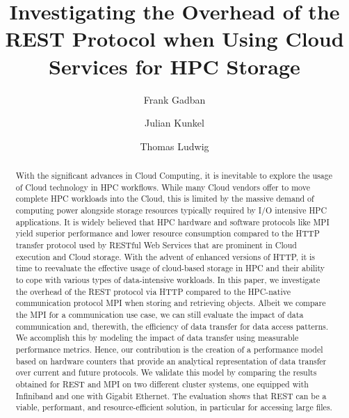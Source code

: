\documentclass[runningheads]{llncs}
\begin{document}
\title{Investigating the Overhead of the REST Protocol when Using Cloud Services for HPC Storage}
\author{Frank Gadban \and Julian Kunkel \and Thomas Ludwig}

\maketitle

\begin{abstract}
With the significant advances in Cloud Computing, it is inevitable to explore the usage of Cloud technology in HPC workflows. While many Cloud vendors offer to move complete HPC workloads into the Cloud, this is limited by the massive demand of computing power alongside storage resources typically required by I/O intensive HPC applications. It is widely believed that HPC hardware and software protocols like MPI yield superior performance and lower resource consumption compared to the HTTP transfer protocol used by RESTful Web Services that are prominent in Cloud execution and Cloud storage. With the advent of enhanced versions of HTTP, it is time to reevaluate the effective usage of cloud-based storage in HPC and their ability to cope with various types of data-intensive workloads.
In this paper, we investigate the overhead of the REST protocol via HTTP compared to the HPC-native communication protocol MPI when storing and retrieving objects. Albeit we compare the MPI for a communication use case, we can still evaluate the impact of data communication and, therewith, the efficiency of data transfer for data access patterns. We accomplish this by modeling the impact of data transfer using measurable performance metrics. Hence, our contribution is the creation of a performance model based on hardware counters that provide an analytical representation of data transfer over current and future protocols. We validate this model by comparing the results obtained for REST and MPI on two different cluster systems, one equipped with Infiniband and one with Gigabit Ethernet. The evaluation shows that REST can be a viable, performant, and resource-efficient solution, in particular for accessing large files.
\end{abstract}
%
%
%
\end{document}
